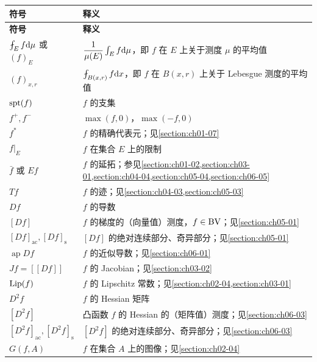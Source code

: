 \documentclass[../../main.tex]{subfiles}%
\begin{document}
\begin{longtable}{@{}p{}p{}@{}}
\toprule
\textbf{符号} & \textbf{释义} \\
\midrule
\endfirsthead
\toprule
\textbf{符号} & \textbf{释义} \\
\midrule
\endhead
$\fint_E f\diff\mu$ 或 $(f)_E$ & $\dfrac{1}{\mu(E)}\int_E f\mathrm{d}\mu$，即 $f$ 在 $E$ 上关于测度 $\mu$ 的平均值 \\
$(f)_{x,r}$ & $\fint_{B(x,r)}f\diff x$，即 $f$ 在 $B(x,r)$ 上关于 Lebesgue 测度的平均值 \\
$\operatorname{spt}(f)$ & $f$ 的支集 \\
$f^+,f^-$ & $\max(f,0)$，$\max(-f,0)$ \\
$f^*$ & $f$ 的精确代表元；见\cref{section:ch01-07} \\%
$f|_E$ & $f$ 在集合 $E$ 上的限制 \\
$\bar f$ 或 $Ef$ & $f$ 的延拓；参见\cref{section:ch01-02,section:ch03-01,section:ch04-04,section:ch05-04,section:ch06-05} \\%
$Tf$ & $f$ 的迹；见\cref{section:ch04-03,section:ch05-03} \\%
$Df$ & $f$ 的导数 \\
$[Df]$ & $f$ 的梯度的（向量值）测度，$f\in\mathrm{BV}$；见\cref{section:ch05-01} \\%
$[Df]_{\mathrm{ac}},[Df]_{\mathrm{s}}$ & $[Df]$ 的绝对连续部分、奇异部分；见\cref{section:ch05-01} \\%
$\operatorname{ap}Df$ & $f$ 的近似导数；见\cref{section:ch06-01} \\%
$Jf=[\![Df]\!]$ & $f$ 的 Jacobian；见\cref{section:ch03-02} \\%
$\operatorname{Lip}(f)$ & $f$ 的 Lipschitz 常数；见\cref{section:ch02-04,section:ch03-01} \\%
$D^2f$ & $f$ 的 Hessian 矩阵 \\
$[D^2f]$ & 凸函数 $f$ 的 Hessian 的（矩阵值）测度；见\cref{section:ch06-03} \\%
$[D^2f]_{\mathrm{ac}},[D^2f]_{\mathrm{s}}$ & $[D^2f]$ 的绝对连续部分、奇异部分；见\cref{section:ch06-03} \\%
$G(f,A)$ & $f$ 在集合 $A$ 上的图像；见\cref{section:ch02-04} \\%
\bottomrule
\end{longtable}
\end{document}
